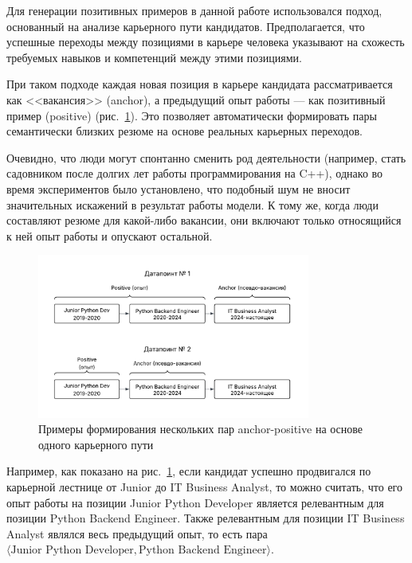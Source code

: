 \documentclass[14pt]{mmcs_article}
\begin{document}
Для генерации позитивных примеров в данной работе использовался подход, основанный на анализе карьерного пути кандидатов. Предполагается, что успешные переходы между позициями в карьере человека указывают на схожесть требуемых навыков и компетенций между этими позициями.

При таком подходе каждая новая позиция в карьере кандидата рассматривается как <<вакансия>> (anchor), а предыдущий опыт работы --- как позитивный пример (positive) (рис.~\ref{fig:career_path_example}). Это позволяет автоматически формировать пары семантически близких резюме на основе реальных карьерных переходов.

Очевидно, что люди могут спонтанно сменить род деятельности (например, стать садовником после долгих лет работы программирования на C++), однако во время экспериментов было установлено, что подобный шум не вносит значительных искажений в результат работы модели. К тому же, когда люди составляют резюме для какой-либо вакансии, они включают только относящийся к ней опыт работы и опускают остальной.

\begin{figure}[h]
  \centering
  \includegraphics[width=0.8\textwidth]{plots/career_path_example.pdf}
  \caption{\centering Примеры формирования нескольких пар anchor-positive на основе одного карьерного пути}
  \label{fig:career_path_example}
\end{figure}

Например, как показано на рис.~\ref{fig:career_path_example}, если кандидат успешно продвигался по карьерной лестнице от Junior до IT Business Analyst, то можно считать, что его опыт работы на позиции Junior Python Developer является релевантным для позиции Python Backend Engineer. Также релевантным для позиции IT Business Analyst являлся весь предыдущий опыт, то есть пара $\langle\text{Junior Python Developer},\text{Python Backend Engineer}\rangle$.
\end{document}
